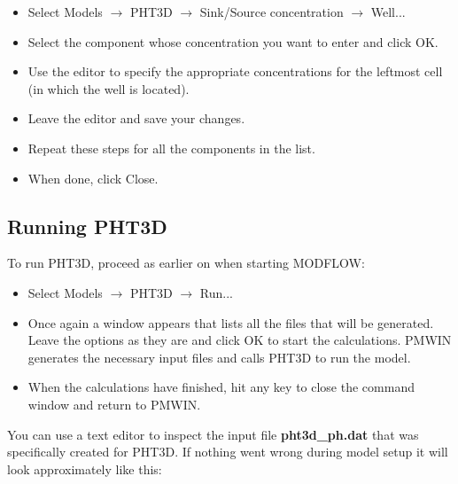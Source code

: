 \begin{itemize}

\item Select Models $\rightarrow$ PHT3D $\rightarrow$ Sink/Source concentration $\rightarrow$ Well...

\item Select the component whose concentration you want to enter and click OK.

\item Use the editor to specify the appropriate concentrations for the leftmost cell (in which the well is located).

\item Leave the editor and save your changes.

\item Repeat these steps for all the components in the list.

\item When done, click Close.

\end{itemize}

\subsection[Running PHT3D]{Running PHT3D}

To run PHT3D, proceed as earlier on when starting MODFLOW:

\begin{itemize}

\item Select Models $\rightarrow$ PHT3D $\rightarrow$ Run...

\item Once again a window appears that lists all the files that will be generated. Leave the options as they are and click OK to start the calculations. PMWIN generates the necessary input files and calls PHT3D to run the model. 

\item When the calculations have finished, hit any key to close the command window and return to PMWIN.

\end{itemize}

You can use a text editor to inspect the input file {\color{red} \textbf{pht3d\_ph.dat}} 
that was specifically created for PHT3D. 
If nothing went wrong during model setup it will look approximately like this:

